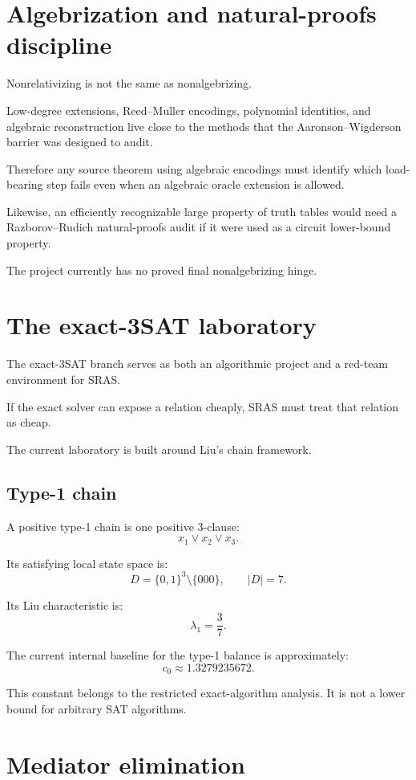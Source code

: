\documentclass[11pt]{article}
\theoremstyle{plain}
\theoremstyle{definition}
\theoremstyle{remark}
\begin{document}
\section{Algebrization and natural-proofs discipline}

Nonrelativizing is not the same as nonalgebrizing.

Low-degree extensions, Reed--Muller encodings, polynomial identities, and
algebraic reconstruction live close to the methods that the
Aaronson--Wigderson barrier was designed to audit.

Therefore any source theorem using algebraic encodings must identify which
load-bearing step fails even when an algebraic oracle extension is allowed.

Likewise, an efficiently recognizable large property of truth tables would
need a Razborov--Rudich natural-proofs audit if it were used as a circuit
lower-bound property.

The project currently has no proved final nonalgebrizing hinge.

\section{The exact-3SAT laboratory}

The exact-3SAT branch serves as both an algorithmic project and a red-team
environment for SRAS.

If the exact solver can expose a relation cheaply, SRAS must treat that
relation as cheap.

The current laboratory is built around Liu's chain framework.

\subsection{Type-1 chain}

A positive type-1 chain is one positive 3-clause:
\[
x_1\vee x_2\vee x_3.
\]

Its satisfying local state space is:
\[
D
=
\{0,1\}^3\setminus\{000\},
\qquad
|D|=7.
\]

Its Liu characteristic is:
\[
\boxed{
\lambda_1=\frac37.
}
\]

The current internal baseline for the type-1 balance is approximately:
\[
c_0\approx1.3279235672.
\]

This constant belongs to the restricted exact-algorithm analysis.  It is not
a lower bound for arbitrary SAT algorithms.

\section{Mediator elimination}
\end{document}
